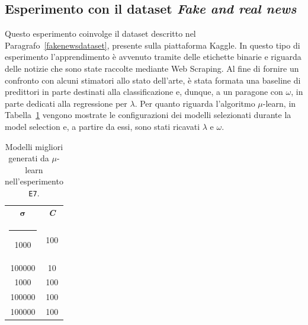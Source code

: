 \documentclass[12pt]{report}
\makeatletter
\theoremstyle{definition}
\newcommand{\thickhline}{%
    \noalign {\ifnum 0=`}\fi \hrule height 1pt
    \futurelet \reserved@a \@xhline
}
\makeatother
\begin{document}
\subsection{Esperimento con il dataset \textit{Fake and real news}}\label{kaggleexperiment}
Questo esperimento coinvolge il dataset descritto nel Paragrafo~\ref{fakenewsdataset}, presente sulla piattaforma Kaggle. In questo tipo di esperimento l'apprendimento è avvenuto tramite delle etichette binarie e riguarda delle notizie che sono state raccolte mediante Web Scraping.
Al fine di fornire un confronto con alcuni stimatori allo stato dell'arte, è stata formata una baseline di predittori in parte destinati alla classificazione e, dunque, a un paragone con $\omega$, in parte dedicati alla regressione per $\lambda$.
Per quanto riguarda l'algoritmo $\mu$-learn, in Tabella~\ref{models_exp7} vengono mostrate le configurazioni dei modelli selezionati durante la model selection e, a partire da essi, sono stati ricavati $\lambda$ e $\omega$.
\begin{table}
\centering
\begin{adjustbox}{max width=\textwidth}
 \begin{tabular}{|c|c|} 
 \hline
$\bm{\sigma}$ & \textit{\textbf{C}}
\\ [0.5ex] 
 \thickhline
 1000 & 100 \\
 100000 & 10 \\
 1000 & 100 \\
 100000 & 100 \\
 100000 & 100 \\
 \hline
\end{tabular}
\end{adjustbox}
\caption{Modelli migliori generati da $\mu$-learn nell'esperimento \texttt{E7}.}
\label{models_exp7}
\end{table}
\end{document}
